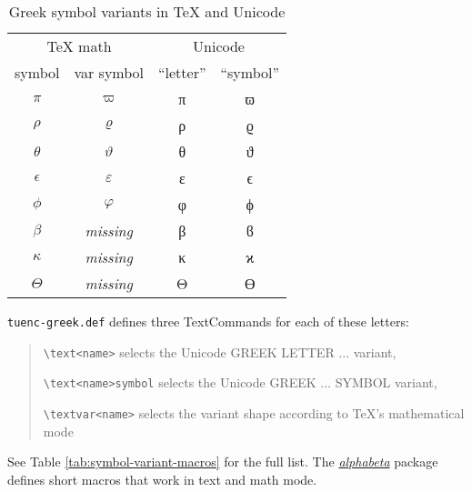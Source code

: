 \documentclass[a4paper]{scrartcl}
\begin{document}
\begin{table}[tbp]
  \centering
  \begin{tabular}{cccc}
  \hline
  \multicolumn{2}{c}{TeX math} & \multicolumn{2}{c}{Unicode} \\
  symbol & var symbol & “letter” & “symbol” \\
  \hline
  $\pi$      & $\varpi$       & π & ϖ \\
  $\rho$     & $\varrho$      & ρ & ϱ \\
  $\theta$   & $\vartheta$    & θ & ϑ \\
  \hline
  $\epsilon$ & $\varepsilon$  & ε & ϵ \\
  $\phi$     & $\varphi$      & φ & ϕ \\
  \hline
  $\beta$    & \emph{missing} & β & ϐ \\
  $\kappa$   & \emph{missing} & κ & ϰ \\
  $\Theta$   & \emph{missing} & Θ & ϴ \\
  \hline
  \end{tabular}
  \caption{Greek symbol variants in TeX and Unicode}
  \label{tab:symbol-variants}
\end{table}

\texttt{tuenc-greek.def} defines three TextCommands for each of these
letters:
\begin{quote}
  \verb|\text<name>| selects the Unicode GREEK LETTER ... variant,

  \verb|\text<name>symbol| selects the Unicode
     GREEK ... SYMBOL variant,

  \verb|\textvar<name>| selects the variant
    shape according to TeX's mathematical mode
\end{quote}
See Table \ref{tab:symbol-variant-macros} for the full list. The
\href{alphabeta-doc.pdf}{\emph{alphabeta}} package defines short macros that
work in text and math mode.
\end{document}
